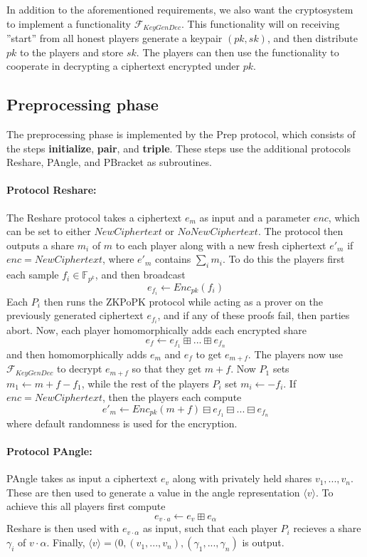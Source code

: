 \documentclass[../main.tex]{subfiles}
\begin{document}
In addition to the aforementioned requirements, we also want the cryptosystem to implement a functionality $\mathcal{F}_{KeyGenDec}$. This functionality will on receiving ''start'' from all honest players generate a keypair $(pk, sk)$, and then distribute $pk$ to the players and store $sk$. The players can then use the functionality to cooperate in decrypting a ciphertext encrypted under $pk$.

\subsection{Preprocessing phase} \label{subsection: Prep}
The preprocessing phase is implemented by the Prep protocol, which consists of the steps \textbf{initialize}, \textbf{pair}, and \textbf{triple}. These steps use the additional protocols Reshare, PAngle, and PBracket as subroutines.

\paragraph{Protocol Reshare:} The Reshare protocol takes a ciphertext $e_m$ as input and a parameter $enc$, which can be set to either $NewCiphertext$ or $NoNewCiphertext$. The protocol then outputs a share $m_i$ of $m$ to each player along with a new fresh ciphertext $e'_m$ if $enc = NewCiphertext$, where $e'_m$ contains $\sum_i m_i$.
To do this the players first each sample $f_i \in \mathbb{F}_{p^k}$, and then broadcast $$e_{f_i} \leftarrow Enc_{pk}(f_i)$$
Each $P_i$ then runs the ZKPoPK protocol while acting as a prover on the previously generated ciphertext $e_{f_i}$, and if any of these proofs fail, then parties abort.
Now, each player homomorphically adds each encrypted share
$$e_f \leftarrow e_{f_1} \boxplus ... \boxplus e_{f_n} $$
and then homomorphically adds $e_m$ and $e_f$ to get $e_{m + f}$. The players now use $\mathcal{F}_{KeyGenDec}$ to decrypt $e_{m + f}$ so that they get $m + f$. Now $P_1$ sets $m_1 \leftarrow m + f - f_1$, while the rest of the players $P_i$ set $m_i \leftarrow - f_i$.
If $enc = NewCiphertext$, then the players each compute
$$e'_m \leftarrow Enc_{pk}(m + f) \boxminus e_{f_1} \boxminus ... \boxminus e_{f_n}$$ where default randomness is used for the encryption.

\paragraph{Protocol PAngle:}
PAngle takes as input a ciphertext $e_v$ along with privately held shares $v_1, ..., v_n$. These are then used to generate a value in the angle representation $\langle v \rangle$.
To achieve this all players first compute $$e_{v \cdot a} \leftarrow e_v \boxplus e_\alpha$$
Reshare is then used with $e_{v \cdot \alpha}$ as input, such that each player $P_i$ recieves a share $\gamma_i$ of $v \cdot \alpha$. Finally, $\langle v \rangle = (0, (v_1, ..., v_n), (\gamma_1, ..., \gamma_n)$ is output.
\end{document}
